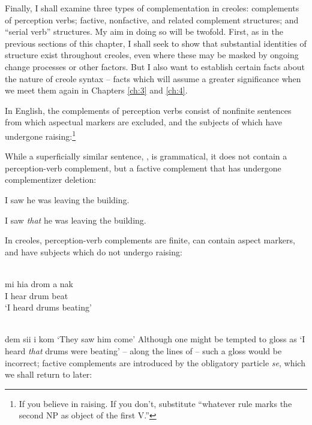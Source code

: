 Finally, I shall examine three types of complementation in creoles: complements of perception verbs; factive, nonfactive, and related complement structures; and ``serial verb'' structures. My aim in doing so will be twofold. First, as in the previous sections of this chapter, I shall seek to show that substantial identities of structure exist throughout creoles, even where these may be masked by ongoing change processes or other factors. But I also want to establish certain facts about the nature of creole syntax -- facts which will assume a greater significance when we meet them again in Chapters \ref{ch:3} and \ref{ch:4}.

In English, the complements of perception verbs consist of nonfinite sentences from which aspectual markers are excluded, and the subjects of which have undergone raising:\footnote{If you believe in raising. If you don't, substitute ``whatever rule marks the second NP as object of the first V.''}

\z

\z

\z

\z

\z
While a superficially similar sentence, , is grammatical, it does not contain a perception-verb complement, but a factive complement that has undergone complementizer deletion:

\ea\label{ex:2:130}I saw he was leaving the building.\z

\ea\label{ex:2:131}I saw \textit{that} he was leaving the building.\z

In creoles, perception-verb complements are finite, can contain aspect markers, and have subjects which do not undergo raising:

\ea\label{ex:2:132}
\langinfo{\langGC}{}{}\\
\gll mi hia drom a nak\\
I hear drum {\ASP} beat\\
\glt `I heard drums beating'
\z

\ea\label{ex:2:133}
\langinfo{\langGC}{}{}\\
dem sii i kom
\glt `They saw him come'
\z
Although one might be tempted to gloss  as `I heard \textit{that} drums were beating' -- along the lines of  -- such a gloss would be incorrect; factive complements are introduced by the obligatory particle \textit{se}, which we shall return to later:

